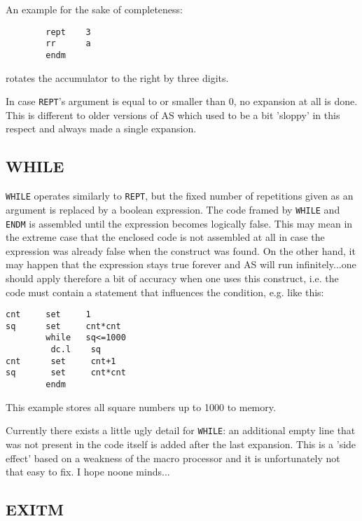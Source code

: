 \documentclass[12pt,twoside]{report}
\makeatletter
\newcommand{\tty}[1]{{\tt #1}}
\newcommand{\ttindex}[1]{\index{#1@{\tt #1}}}
\makeatother
\begin{document}
An example for the sake of completeness:
\begin{verbatim}
        rept    3
        rr      a
        endm
\end{verbatim}
rotates the accumulator to the right by three digits.

In case \tty{REPT}'s argument is equal to or smaller than 0, no expansion
at all is done.  This is different to older versions of AS which used to
be a bit 'sloppy' in this respect and always made a single expansion.


\subsection{WHILE}
\ttindex{WHILE}

\tty{WHILE} operates similarly to \tty{REPT}, but the fixed number of
repetitions given as an argument is replaced by a boolean expression.  The
code framed by \tty{WHILE} and \tty{ENDM} is assembled until the
expression becomes logically false.  This may mean in the extreme case
that the enclosed code is not assembled at all in case the expression was
already false when the construct was found.  On the other hand, it may
happen that the expression stays true forever and AS will run
infinitely...one should apply therefore a bit of accuracy when one uses
this construct, i.e. the code must contain a statement that influences the
condition, e.g. like this:
\begin{verbatim}
cnt     set     1
sq      set     cnt*cnt
        while   sq<=1000
         dc.l    sq
cnt      set     cnt+1
sq       set     cnt*cnt
        endm
\end{verbatim}
This example stores all square numbers up to 1000 to memory.

Currently there exists a little ugly detail for \tty{WHILE}: an additional
empty line that was not present in the code itself is added after the last
expansion.  This is a 'side effect' based on a weakness of the macro
processor and it is unfortunately not that easy to fix.  I hope noone
minds...


\subsection{EXITM}
\ttindex{EXITM}
\end{document}
